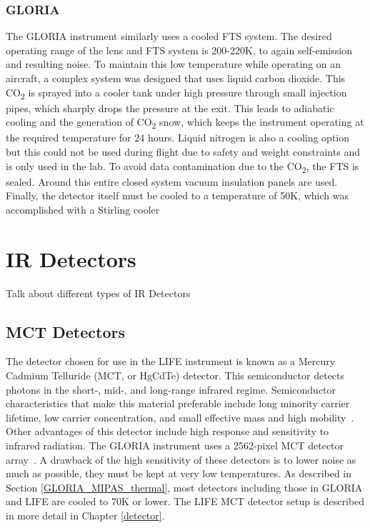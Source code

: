 \subsubsection{GLORIA}
The GLORIA instrument similarly uses a cooled FTS system. The desired operating range of the lens and FTS system is 200-220K, to again self-emission and resulting noise. To maintain this low temperature while operating on an aircraft, a complex system was designed that uses liquid carbon dioxide. This CO\textsubscript{2} is sprayed into a cooler tank under high pressure through small injection pipes, which sharply drops the pressure at the exit. This leads to adiabatic cooling and the generation of CO\textsubscript{2} snow, which keeps the instrument operating at the required temperature for 24 hours. Liquid nitrogen is also a cooling option but this could not be used during flight due to safety and weight constraints and is only used in the lab. To avoid data contamination due to the CO\textsubscript{2}, the FTS is sealed. Around this entire closed system vacuum insulation panels are used. Finally, the detector itself must be cooled to a temperature of 50K, which was accomplished with a Stirling cooler~\citep{GLORIA_concept}~\citep{GLORIA_thermalmech}

\section{IR Detectors}
Talk about different types of IR Detectors

\subsection{MCT Detectors}
The detector chosen for use in the LIFE instrument is known as a Mercury Cadmium Telluride (MCT, or HgCdTe) detector. This semiconductor detects photons in the short-, mid-, and long-range infrared regime. Semiconductor characteristics that make this material preferable include long minority carrier lifetime, low carrier concentration, and small effective mass and high mobility~\citep{MCT_Detectors}. Other advantages of this detector include high response and sensitivity to infrared radiation. The GLORIA instrument uses a 2562-pixel MCT detector array~\citep{GLORIA_concept}. A drawback of the high sensitivity of these detectors is to lower noise as much as possible, they must be kept at very low temperatures. As described in Section \ref{GLORIA_MIPAS_thermal}, most detectors including those in GLORIA and LIFE are cooled to 70K or lower. The LIFE MCT detector setup is described in more detail in Chapter \ref{detector}.

